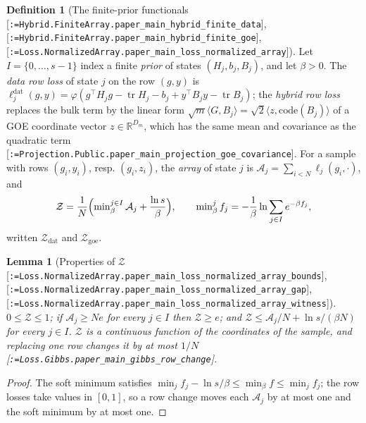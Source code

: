 \documentclass[11pt]{article}
\makeatletter
\newcommand{\formal@break}[1]{\@tfor\formal@tok:=#1\do{%
  \formal@tok
  \expandafter\ifx\formal@tok.\allowbreak\else
  \expandafter\ifx\formal@tok\_\allowbreak\fi\fi}}
\DeclareRobustCommand{\formal}[1]{\textnormal{[\texttt{\small\formal@break{#1}}]}}
\newcommand{\R}{\mathbb{R}}
\newcommand{\ip}[2]{\langle #1, #2\rangle}
\newcommand{\tr}{\operatorname{tr}}
\newcommand{\Dd}{D}
\theoremstyle{plain}
\newtheorem{lemma}[theorem]{Lemma}
\theoremstyle{definition}
\newtheorem{definition}[theorem]{Definition}
\makeatother
\begin{document}
\begin{definition}[The finite-prior functionals \formal{Hybrid.FiniteArray.paper\_main\_hybrid\_finite\_data}, \formal{Hybrid.FiniteArray.paper\_main\_hybrid\_finite\_goe}, \formal{Loss.NormalizedArray.paper\_main\_loss\_normalized\_array}]
Let $I = \{0, \dots, s-1\}$ index a finite \emph{prior} of states
$(H_j, b_j, B_j)$, and let $\beta > 0$. The \emph{data row loss} of state
$j$ on the row $(g, y)$ is $\ell^{\mathrm{dat}}_j(g, y) = \varphi(g^{\top}H_jg - \tr H_j - b_j + y^{\top}B_jy - \tr B_j)$;
the \emph{hybrid row loss} replaces the bulk term by the linear form
$\sqrt m\ip{G}{B_j} = \sqrt2\ip{z}{\mathrm{code}(B_j)}$ of a GOE coordinate
vector $z \in \R^{\Dd_m}$, which has the same mean and covariance as the
quadratic term \formal{Projection.Public.paper\_main\_projection\_goe\_covariance}.
For a sample with rows $(g_i, y_i)$, resp. $(g_i, z_i)$, the \emph{array}
of state $j$ is $\mathcal{A}_j = \sum_{i<N}\ell_j(g_i, \cdot)$, and
\[
\mathcal{Z} = \frac1N\Bigl(\min\nolimits_\beta^{j\in I}\mathcal{A}_j + \frac{\ln s}{\beta}\Bigr),
\qquad \min\nolimits_\beta^{j}f_j = -\frac1\beta\ln\sum_{j\in I}e^{-\beta f_j},
\]
written $\mathcal{Z}_{\mathrm{dat}}$ and $\mathcal{Z}_{\mathrm{goe}}$.
\end{definition}

\begin{lemma}[Properties of $\mathcal{Z}$ \formal{Loss.NormalizedArray.paper\_main\_loss\_normalized\_array\_bounds}, \formal{Loss.NormalizedArray.paper\_main\_loss\_normalized\_array\_gap}, \formal{Loss.NormalizedArray.paper\_main\_loss\_normalized\_array\_witness}]\label{lem:Z}
$0 \le \mathcal{Z} \le 1$; if $\mathcal{A}_j \ge Ne$ for every $j \in I$ then
$\mathcal{Z} \ge e$; and $\mathcal{Z} \le \mathcal{A}_j/N + \ln s/(\beta N)$ for
every $j \in I$. $\mathcal{Z}$ is a continuous function of the coordinates
of the sample, and replacing one row changes it by at most $1/N$
\formal{Loss.Gibbs.paper\_main\_gibbs\_row\_change}.
\end{lemma}

\begin{proof}
The soft minimum satisfies $\min_jf_j - \ln s/\beta \le \min_\beta f \le \min_jf_j$;
the row losses take values in $[0,1]$, so a row change moves each
$\mathcal{A}_j$ by at most one and the soft minimum by at most one.
\end{proof}
\end{document}

